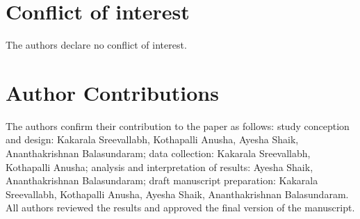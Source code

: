 \documentclass[utf8]{FrontiersinHarvard} %
\begin{document}
\section*{Conflict of interest}
The authors declare no conflict of interest.

\section*{Author Contributions}
The authors confirm their contribution to the paper as follows: study conception and design: Kakarala Sreevallabh, Kothapalli Anusha, Ayesha Shaik, Ananthakrishnan Balasundaram; data collection: Kakarala Sreevallabh, Kothapalli Anusha; analysis and interpretation of results: Ayesha Shaik, Ananthakrishnan Balasundaram; draft manuscript preparation: Kakarala Sreevallabh, Kothapalli Anusha, Ayesha Shaik, Ananthakrishnan Balasundaram. All authors reviewed the results and approved the final version of the manuscript.






\end{document}
